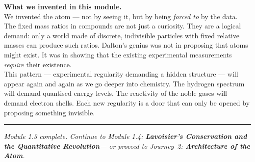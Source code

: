 \documentclass[12pt, a4paper]{book}
\theoremstyle{definition}
\begin{document}
\vspace{1.5em}
\begin{center}
\begin{tcolorbox}[
  enhanced, colback=DiscoveryColor!8, colframe=DiscoveryColor,
  width=0.88\textwidth, arc=3pt
]
\centering\sffamily\small
\textbf{What we invented in this module.}\\[4pt]
We invented the atom --- not by seeing it,
but by being \emph{forced to} by the data.
The fixed mass ratios in compounds are not just a curiosity.
They are a logical demand: only a world made of discrete,
indivisible particles with fixed relative masses
can produce such ratios.
Dalton's genius was not in proposing that atoms might exist.
It was in showing that the existing experimental measurements
\emph{require} their existence.\\[4pt]
This pattern --- experimental regularity demanding a hidden structure ---
will appear again and again as we go deeper into chemistry.
The hydrogen spectrum will demand quantised energy levels.
The reactivity of the noble gases will demand electron shells.
Each new regularity is a door that can only be opened
by proposing something invisible.
\end{tcolorbox}
\end{center}

\vspace{2em}
\noindent\textcolor{JourneyColor!40}{\rule{\textwidth}{0.6pt}}
\begin{center}
\textit{\sffamily\small
Module 1.3 complete. Continue to Module 1.4:
\textbf{Lavoisier's Conservation and the Quantitative Revolution}---
or proceed to Journey~2:
\textbf{Architecture of the Atom}.}
\end{center}
\end{document}
